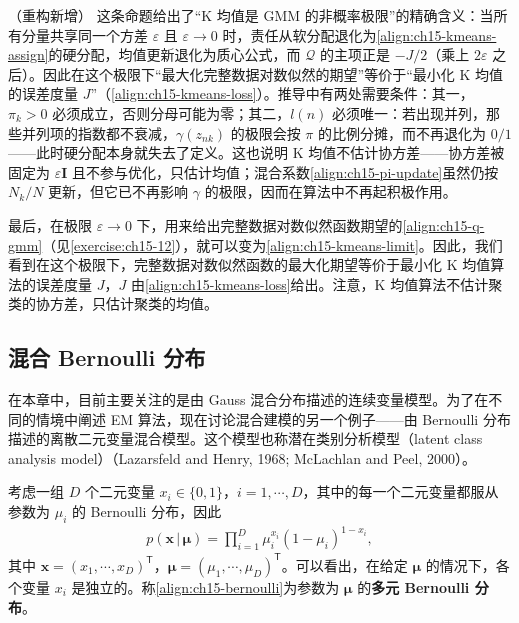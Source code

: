 \documentclass[../../main.tex]{subfiles}
\begin{document}
\begin{remark}（重构新增）
这条命题给出了“K 均值是 GMM 的非概率极限”的精确含义：当所有分量共享同一个方差 $\varepsilon$ 且 $\varepsilon\to0$ 时，责任从软分配退化为\eqref{align:ch15-kmeans-assign}的硬分配，均值更新退化为质心公式，而 $\mathcal{Q}$ 的主项正是 $-J/2$（乘上 $2\varepsilon$ 之后）。因此在这个极限下“最大化完整数据对数似然的期望”等价于“最小化 K 均值的误差度量 $J$”（\eqref{align:ch15-kmeans-loss}）。推导中有两处需要条件：其一，$\pi_k>0$ 必须成立，否则分母可能为零；其二，$l(n)$ 必须唯一：若出现并列，那些并列项的指数都不衰减，$\gamma(z_{nk})$ 的极限会按 $\pi$ 的比例分摊，而不再退化为 $0/1$——此时硬分配本身就失去了定义。这也说明 K 均值不估计协方差——协方差被固定为 $\varepsilon\bm{I}$ 且不参与优化，只估计均值；混合系数\eqref{align:ch15-pi-update}虽然仍按 $N_k/N$ 更新，但它已不再影响 $\gamma$ 的极限，因而在算法中不再起积极作用。
\end{remark}

最后，在极限 $\varepsilon\rightarrow0$ 下，用来给出完整数据对数似然函数期望的\eqref{align:ch15-q-gmm}（见\cref{exercise:ch15-12}），就可以变为\eqref{align:ch15-kmeans-limit}。因此，我们看到在这个极限下，完整数据对数似然函数的最大化期望等价于最小化 K 均值算法的误差度量 $J$，$J$ 由\eqref{align:ch15-kmeans-loss}给出。注意，K 均值算法不估计聚类的协方差，只估计聚类的均值。

\subsection{混合 Bernoulli 分布}\label{subsection:ch15-混合bernoulli}

在本章中，目前主要关注的是由 Gauss 混合分布描述的连续变量模型。为了在不同的情境中阐述 EM 算法，现在讨论混合建模的另一个例子——由 Bernoulli 分布描述的离散二元变量混合模型。这个模型也称潜在类别分析模型（latent class analysis model）（Lazarsfeld and Henry, 1968; McLachlan and Peel, 2000）。

\begin{definition}[多元 Bernoulli 分布]\label{definition:ch15-多元Bernoulli}
考虑一组 $D$ 个二元变量 $x_i\in\{0,1\}$，$i=1,\cdots,D$，其中的每一个二元变量都服从参数为 $\mu_i$ 的 Bernoulli 分布，因此
\begin{align}
p(\bm{x}\,|\,\bm{\mu})=\prod_{i=1}^{D}\mu_i^{x_i}(1-\mu_i)^{1-x_i},
\label{align:ch15-bernoulli}
\end{align}
其中 $\bm{x}=(x_1,\cdots,x_D)^{\mathsf T}$，$\bm{\mu}=(\mu_1,\cdots,\mu_D)^{\mathsf T}$。可以看出，在给定 $\bm{\mu}$ 的情况下，各个变量 $x_i$ 是独立的。称\eqref{align:ch15-bernoulli}为参数为 $\bm{\mu}$ 的\textbf{多元 Bernoulli 分布}。
\end{definition}
\end{document}
